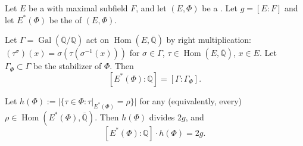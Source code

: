 \begin{proposition} \label{proposition:reflex_field_degree_formula_for_a_cm_type}
    Let $E$ be a  with maximal  subfield $F$, and let $(E, \Phi)$ be a . Let $g = [E:F]$ and let $E^*(\Phi)$ be the  of $(E, \Phi)$.

    Let $\Gamma = \operatorname{Gal}(\overline{\mathbb{Q}}/\mathbb{Q})$ act on $\operatorname{Hom}(E, \overline{\mathbb{Q}})$ by right multiplication: $(\tau^\sigma)(x) = \sigma(\tau(\sigma^{-1}(x)))$ for $\sigma \in \Gamma$, $\tau \in \operatorname{Hom}(E, \overline{\mathbb{Q}})$, $x \in E$. Let $\Gamma_\Phi \subset \Gamma$ be the stabilizer of $\Phi$. Then
    $$[E^*(\Phi) : \mathbb{Q}] = [\Gamma : \Gamma_\Phi].$$

    Let $h(\Phi) := |\{\tau \in \Phi : \tau|_{E^*(\Phi)} = \rho\}|$ for any (equivalently, every) $\rho \in \operatorname{Hom}(E^*(\Phi), \overline{\mathbb{Q}})$. Then $h(\Phi)$ divides $2g$, and
    $$[E^*(\Phi) : \mathbb{Q}] \cdot h(\Phi) = 2g.$$
\end{proposition}

